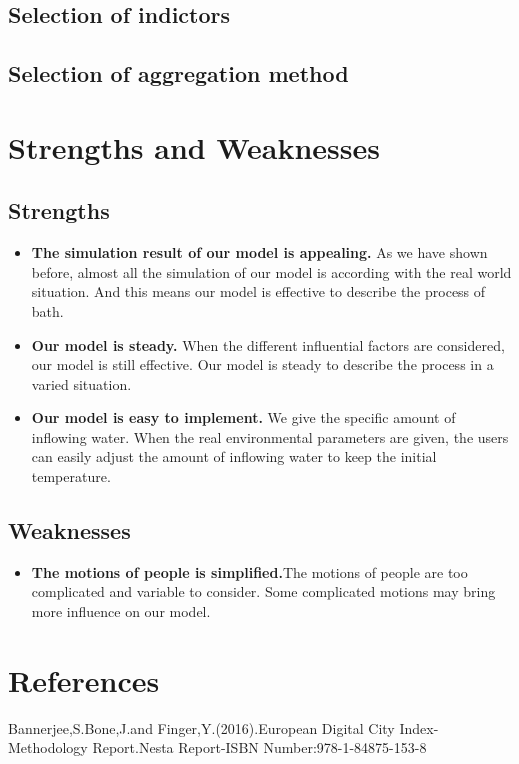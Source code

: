 \documentclass{mcmthesis}
\begin{document}
\subsection{Selection of indictors}%
\subsection{Selection of aggregation method}%
\section{Strengths and Weaknesses}
\subsection{Strengths}
\begin{itemize}
\item{\textbf{The simulation result of our model is appealing.} As we have shown before, almost all the simulation of our model is according with the real world situation. And this means our model is effective to describe the process of bath.}
\item{\textbf{Our model is steady.} When the different influential factors are considered, our model is still effective. Our model is steady to describe the process in a varied situation. }
\item{\textbf{Our model is easy to implement.} We give the specific amount of inflowing water. When the real environmental parameters are given, the users can easily adjust the amount of inflowing water to keep the initial temperature. }
\end{itemize}
\subsection{Weaknesses}
\begin{itemize}
\item{\textbf{The motions of people is simplified.}The motions of people are too complicated and variable to consider. Some complicated motions may bring more influence on our model. }
\end{itemize}


\section{References}
\begin{thebibliography}{99}
Bannerjee,S.Bone,J.and Finger,Y.(2016).European Digital City Index-Methodology Report.Nesta Report-ISBN Number:978-1-84875-153-8
\end{thebibliography}

\begin{appendices}
\end{appendices}
\end{document}
